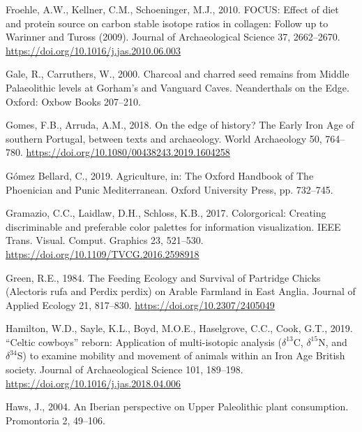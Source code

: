 \documentclass[preprint, 3p, authoryear]{elsarticle} %
\newlength{\cslhangindent}
\newlength{\cslentryspacingunit} %
\newenvironment{CSLReferences}[2] %
 {%
  \setlength{\parindent}{0pt}
  \ifodd #1
  \let\oldpar\par
  \def\par{\hangindent=\cslhangindent\oldpar}
  \fi
  \setlength{\parskip}{#2\cslentryspacingunit}
 }%
 {}
\begin{document}
\begin{CSLReferences}{1}{0}
\leavevmode{}%
Froehle, A.W., Kellner, C.M., Schoeninger, M.J., 2010. {FOCUS}: Effect of diet and protein source on carbon stable isotope ratios in collagen: Follow up to {Warinner} and {Tuross} (2009). Journal of Archaeological Science 37, 2662--2670. \url{https://doi.org/10.1016/j.jas.2010.06.003}

\leavevmode{}%
Gale, R., Carruthers, W., 2000. Charcoal and charred seed remains from {Middle Palaeolithic} levels at {Gorham}'s and {Vanguard Caves}. Neanderthals on the Edge. Oxford: Oxbow Books 207--210.

\leavevmode{}%
Gomes, F.B., Arruda, A.M., 2018. On the edge of history? {The Early Iron Age} of southern {Portugal}, between texts and archaeology. World Archaeology 50, 764--780. \url{https://doi.org/10.1080/00438243.2019.1604258}

\leavevmode{}%
Gómez Bellard, C., 2019. Agriculture, in: The {Oxford Handbook} of {The Phoenician} and {Punic Mediterranean}. {Oxford University Press}, pp. 732--745.

\leavevmode{}%
Gramazio, C.C., Laidlaw, D.H., Schloss, K.B., 2017. Colorgorical: {Creating} discriminable and preferable color palettes for information visualization. IEEE Trans. Visual. Comput. Graphics 23, 521--530. \url{https://doi.org/10.1109/TVCG.2016.2598918}

\leavevmode{}%
Green, R.E., 1984. The {Feeding Ecology} and {Survival} of {Partridge Chicks} ({Alectoris} rufa and {Perdix} perdix) on {Arable Farmland} in {East Anglia}. Journal of Applied Ecology 21, 817--830. \url{https://doi.org/10.2307/2405049}

\leavevmode{}%
Hamilton, W.D., Sayle, K.L., Boyd, M.O.E., Haselgrove, C.C., Cook, G.T., 2019. {``{Celtic} cowboys''} reborn: Application of multi-isotopic analysis ({\(\delta^{13}\)C}, {\(\delta^{15}\)N}, and {\(\delta^{34}\)S}) to examine mobility and movement of animals within an {Iron Age British} society. Journal of Archaeological Science 101, 189--198. \url{https://doi.org/10.1016/j.jas.2018.04.006}

\leavevmode{}%
Haws, J., 2004. An {Iberian} perspective on {Upper Paleolithic} plant consumption. Promontoria 2, 49--106.


\end{CSLReferences}
\end{document}
